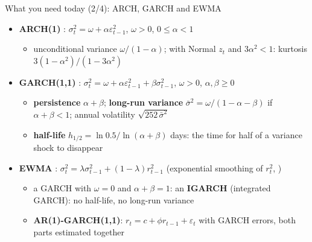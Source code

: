 \begin{frame}{What you need today (2/4): ARCH, GARCH and EWMA}
\itemsize{\small}
\begin{itemize}
    \item \textbf{ARCH(1)} : $\sigma_t^2 = \omega + \alpha\varepsilon_{t-1}^2$, $\omega > 0$, $0 \le \alpha < 1$
    \begin{itemize}
        \item unconditional variance $\omega/(1 - \alpha)$; with Normal $z_t$ and $3\alpha^2 < 1$: kurtosis $3(1 - \alpha^2)/(1 - 3\alpha^2)$
    \end{itemize}
    \item \textbf{GARCH(1,1)} : $\sigma_t^2 = \omega + \alpha\varepsilon_{t-1}^2 + \beta\sigma_{t-1}^2$, $\omega > 0$, $\alpha, \beta \ge 0$
    \begin{itemize}
        \item \textbf{persistence} $\alpha + \beta$; \textbf{long-run variance} $\bar\sigma^2 = \omega/(1 - \alpha - \beta)$ if $\alpha + \beta < 1$; annual volatility $\sqrt{252\,\bar\sigma^2}$
        \item \textbf{half-life} $h_{1/2} = \ln 0.5/\ln(\alpha + \beta)$ days: the time for half of a variance shock to disappear
    \end{itemize}
    \item \textbf{EWMA} : $\sigma_t^2 = \lambda\sigma_{t-1}^2 + (1 - \lambda)r_{t-1}^2$ (exponential smoothing of $r_t^2$, )
    \begin{itemize}
        \item a GARCH with $\omega = 0$ and $\alpha + \beta = 1$: an \textbf{IGARCH} (integrated GARCH): no half-life, no long-run variance
        \item \textbf{AR(1)-GARCH(1,1)}: $r_t = c + \phi r_{t-1} + \varepsilon_t$ with GARCH errors, both parts estimated together
    \end{itemize}
\end{itemize}
\end{frame}

